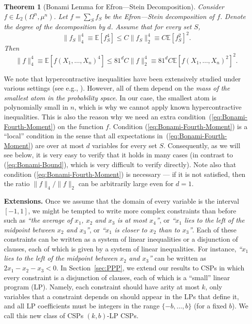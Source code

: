 \documentclass[11pt]{article}
\newcommand {\Exp}       {\mathbb{E}}
\newcommand {\E}     [1] {\Exp\left[#1\right]}
\newtheorem{theorem}{Theorem}
\begin{document}
\begin{theorem}[Bonami Lemma for Efron---Stein Decomposition]\label{thm:bonami-for-ES}
Consider $f \in L_2(\Omega^n, \mu^n)$. Let $f = \sum_{S} f_S$ be the Efron---Stein decomposition of $f$. Denote the degree of the decomposition by $d$.
Assume that for every set $S$,
\begin{equation}\label{eq:Bonami-Fourth-Moment}
\|f_S\|_4^4 \equiv \E{f_{S}^4} \leq C \|f_S\|_2^4 \equiv C \E{f_{S}^2}^2.
\end{equation}
Then
\begin{equation}\label{eq:Bonami-Bound}
\|f\|_4^4 \equiv \E{f(X_1,\dots, X_n)^4} \leq 81^d C \|f\|_2^4 \equiv 81^d C  \E{f(X_1,\dots, X_n)^2}^2.
\end{equation}
\end{theorem}
We note that hypercontractive inequalities have been extensively studied under various settings
(see e.g., \cite{Talagrand94, DS96, Wolf07, MOS}). However, all of them depend on
the \textit{mass of the smallest atom in the probability space}. In our case, the smallest atom is polynomially small in $n$,
which is why we cannot apply known hypercontractive inequalities.
This is also the reason why we need an extra condition~(\ref{eq:Bonami-Fourth-Moment}) on the function $f$.
Condition (\ref{eq:Bonami-Fourth-Moment}) is a ``local'' condition in
the sense that all expectations in~(\ref{eq:Bonami-Fourth-Moment}) are over at most $d$ variables for every set $S$.
Consequently, as we will see below, it is very easy to verify that it holds in many cases
(in contrast to (\ref{eq:Bonami-Bound}), which is very difficult to verify directly).
Note also that  condition (\ref{eq:Bonami-Fourth-Moment}) is necessary --- if it is not satisfied, then the ratio $\|f\|_4/\|f\|_2$ can
be arbitrarily large even for $d=1$.

\medskip

\noindent\textbf{Extensions.}
Once we assume that the domain of every variable is the interval $[-1,1]$, we might be tempted
to write more complex constraints than before such as
\emph{``the average of $x_1$, $x_2$ and $x_3$ is at most
$x_4$''}, or \emph{``$x_1$ lies to the left of the midpoint between $x_2$ and $x_3$''},
or \emph{``$x_1$ is closer to $x_2$ than to $x_3$''}.
 Each of these constraints can be written as a system of linear inequalities or a disjunction of clauses,
 each of which is given by a system of linear inequalities. For instance,
  \emph{``$x_1$ lies to the left of the midpoint between $x_2$ and $x_3$''}
  can be written as  $2x_1 - x_2 -  x_3 < 0$.
In Section~\ref{sec:PPP}, we extend our results to CSPs in which every constraint is a disjunction of clauses, each of which is
a ``small'' linear program (LP).
Namely, each constraint should have arity at most $k$, only variables that a constraint depends on should appear in the LPs that define it,
and all LP coefficients must be integers in the range $\{-b,\dots,b\}$ (for a fixed $b$).
We call this new class of CSPs $(k,b)$-LP CSPs.
\end{document}
